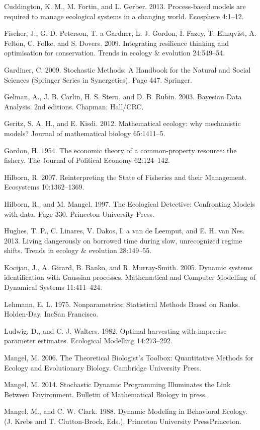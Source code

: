 \documentclass[author-year, 12pt,review]{components/elsarticle} %
\begin{document}
Cuddington, K. M., M. Fortin, and L. Gerber. 2013. Process-based models
are required to manage ecological systems in a changing world. Ecosphere
4:1--12.

Fischer, J., G. D. Peterson, T. a Gardner, L. J. Gordon, I. Fazey, T.
Elmqvist, A. Felton, C. Folke, and S. Dovers. 2009. Integrating
resilience thinking and optimisation for conservation. Trends in ecology
\& evolution 24:549--54.

Gardiner, C. 2009. Stochastic Methods: A Handbook for the Natural and
Social Sciences (Springer Series in Synergetics). Page 447. Springer.

Gelman, A., J. B. Carlin, H. S. Stern, and D. B. Rubin. 2003. Bayesian
Data Analysis. 2nd editions. Chapman; Hall/CRC.

Geritz, S. A. H., and E. Kisdi. 2012. Mathematical ecology: why
mechanistic models? Journal of mathematical biology 65:1411--5.

Gordon, H. 1954. The economic theory of a common-property resource: the
fishery. The Journal of Political Economy 62:124--142.

Hilborn, R. 2007. Reinterpreting the State of Fisheries and their
Management. Ecosystems 10:1362--1369.

Hilborn, R., and M. Mangel. 1997. The Ecological Detective: Confronting
Models with data. Page 330. Princeton University Press.

Hughes, T. P., C. Linares, V. Dakos, I. a van de Leemput, and E. H. van
Nes. 2013. Living dangerously on borrowed time during slow, unrecognized
regime shifts. Trends in ecology \& evolution 28:149--55.

Kocijan, J., A. Girard, B. Banko, and R. Murray-Smith. 2005. Dynamic
systems identification with Gaussian processes. Mathematical and
Computer Modelling of Dynamical Systems 11:411--424.

Lehmann, E. L. 1975. Nonparametrics: Statistical Methods Based on Ranks.
Holden-Day, IncSan Francisco.

Ludwig, D., and C. J. Walters. 1982. Optimal harvesting with imprecise
parameter estimates. Ecological Modelling 14:273--292.

Mangel, M. 2006. The Theoretical Biologist's Toolbox: Quantitative
Methods for Ecology and Evolutionary Biology. Cambridge University
Press.

Mangel, M. 2014. Stochastic Dynamic Programming Illuminates the Link
Between Environment. Bulletin of Mathematical Biology in press.

Mangel, M., and C. W. Clark. 1988. Dynamic Modeling in Behavioral
Ecology. (J. Krebs and T. Clutton-Brock, Eds.). Princeton University
PressPrinceton.
\end{document}
